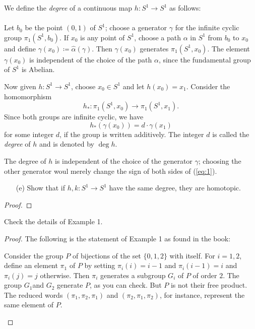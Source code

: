 \begin{problem}[Munkres \S58, Ex.9(a,b,c)]
We define the \emph{degree} of a continuous map $h\colon S^1\to S^1$ as
follows:
\\\\
Let $b_0$ be the point $(0,1)$ of $S^1$; choose a generator $\gamma$ for
the infinite cyclic group $\pi_1(S^1,b_0)$. If $x_0$ is any point of $S^1$,
choose a path $\alpha$ in $S^1$ from $b_0$ to $x_0$ and define
$\gamma(x_0)\coloneqq\hat\alpha(\gamma)$. Then $\gamma(x_0)$ generates
$\pi_1(S^1,x_0)$. The element $\gamma(x_0)$ is independent of the choice of
the path $\alpha$, since the fundamental group of $S^1$ is Abelian.

Now given $h\colon S^1\to S^1$, choose $x_0\in S^1$ and let
$h(x_0)=x_1$. Consider the homomorphism
\[
h_*\colon\pi_1(S^1,x_0)\longrightarrow\pi_1(S^1,x_1).
\]
Since both groups are infinite cyclic, we have
\begin{equation}
\label{eq:1}
\tag{*}
h_*(\gamma(x_0))=d\cdot\gamma(x_1)
\end{equation}
for some integer $d$, if the group is written additively. The integer $d$
is called the \emph{degree} of $h$ and is denoted by $\deg h$.

The degree of $h$ is independent of the choice of the generator $\gamma$;
choosing the other generator woul merely change the sign of both sides of
(\ref{eq:1}).
\begin{enumerate}
\item[(e)] Show that if $h,k\colon S^1\to S^1$ have the same degree, they
  are homotopic.
\end{enumerate}
\end{problem}
\begin{proof}
\end{proof}
\newpage
\begin{problem}[Munkres \S69, Ex.\,1]
Check the details of Example 1.
\end{problem}
\begin{proof}
The following is the statement of Example 1 as found in the book:
\begin{example*}[1]
Consider the group $P$ of bijections of the set $\{0,1,2\}$ with
itself. For $i=1,2$, define an element $\pi_1$ of $P$ by setting
$\pi_i(i)=i-1$ and $\pi_i(i-1)=i$ and $\pi_i(j)=j$ otherwise. Then $\pi_i$
generates a subgroup $G_i$ of $P$ of order $2$. The group $G_1$and $G_2$
generate $P$, as you can check. But $P$ is not their free product. The
reduced words $(\pi_1,\pi_2,\pi_1)$ and $(\pi_2,\pi_1,\pi_2)$, for
instance, represent the same element of $P$.
\end{example*}
\end{proof}
